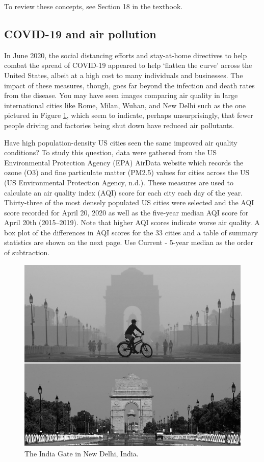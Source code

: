 \documentclass[
]{report}
\begin{document}
To review these concepts, see Section 18 in the textbook.

\hypertarget{covid-19-and-air-pollution}{%
\subsection{COVID-19 and air pollution}\label{covid-19-and-air-pollution}}

In June 2020, the social distancing efforts and stay-at-home directives to help combat the spread of COVID-19 appeared to help `flatten the curve' across the United States, albeit at a high cost to many individuals and businesses. The impact of these measures, though, goes far beyond the infection and death rates from the disease. You may have seen images comparing air quality in large international cities like Rome, Milan, Wuhan, and New Delhi such as the one pictured in Figure \ref{fig:covid}, which seem to indicate, perhaps unsurprisingly, that fewer people driving and factories being shut down have reduced air pollutants.

Have high population-density US cities seen the same improved air quality conditions? To study this question, data were gathered from the US Environmental Protection Agency (EPA) AirData website which records the ozone (O3) and fine particulate matter (PM2.5) values for cities across the US (US Environmental Protection Agency, n.d.). These measures are used to calculate an air quality index (AQI) score for each city each day of the year. Thirty-three of the most densely populated US cities were selected and the AQI score recorded for April 20, 2020 as well as the five-year median AQI score for April 20th (2015--2019). Note that higher AQI scores indicate worse air quality. A box plot of the differences in AQI scores for the 33 cities and a table of summary statistics are shown on the next page. Use Current - 5-year median as the order of subtraction.

\begin{figure}

{\centering \includegraphics[width=0.6\linewidth]{images/air_pollution_greyscale} 

}

\caption{The India Gate in New Delhi, India.}\label{fig:covid}
\end{figure}
\end{document}
